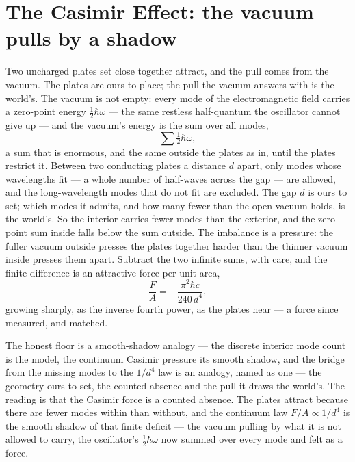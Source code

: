 \section{The Casimir Effect: the vacuum pulls by a shadow}
\label{se:casimir}

Two uncharged plates set close together attract, and the pull comes from the vacuum. The plates are ours to
place; the pull the vacuum answers with is the world's. The vacuum is not empty: every mode of the
electromagnetic field carries a zero-point energy $\tfrac12\hbar\omega$ --- the same restless half-quantum the
oscillator cannot give up --- and the vacuum's energy is the sum
over all modes,
\begin{equation}
  \sum \tfrac12\hbar\omega,
\end{equation}
a sum that is enormous, and the same outside the plates as in, until the plates restrict it. Between two
conducting plates a distance $d$ apart, only modes whose wavelengths fit --- a whole number of half-waves
across the gap --- are allowed, and the long-wavelength modes that do not fit are excluded. The gap $d$ is ours
to set; which modes it admits, and how many fewer than the open vacuum holds, is the world's. So the interior
carries fewer modes than the exterior, and the zero-point sum inside falls below the sum outside. The imbalance
is a pressure: the fuller vacuum outside presses the plates together harder than the thinner vacuum inside
presses them apart. Subtract the two infinite sums, with care, and the finite difference is an attractive force
per unit area,
\begin{equation}
  \frac{F}{A} = -\frac{\pi^2 \hbar c}{240\, d^4},
\end{equation}
growing sharply, as the inverse fourth power, as the plates near --- a force since measured, and matched.

The honest floor is a smooth-shadow analogy --- the discrete interior mode count is the model, the continuum
Casimir pressure its smooth shadow, and the bridge from the missing modes to the $1/d^4$ law is an analogy,
named as one --- the geometry ours to set, the counted absence and the pull it draws the world's. The reading
is that the Casimir force is a counted absence. The plates attract because there are
fewer modes within than without, and the continuum law $F/A \propto 1/d^4$ is the smooth shadow of that finite
deficit --- the vacuum pulling by what it is not allowed to carry, the oscillator's $\tfrac12\hbar\omega$ now
summed over every mode and felt as a force.

